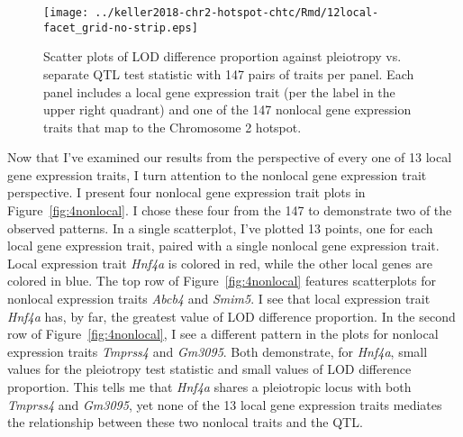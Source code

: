 \documentclass[oneside]{book}\usepackage[]{graphicx}\usepackage[]{color}
\begin{document}
\begin{titlepage}
\begin{figure}
    \centering
    \texttt{[image: ../keller2018-chr2-hotspot-chtc/Rmd/12local-facet\_grid-no-strip.eps]}
    \caption[LOD difference proportion vs. pleiotropy test statistic from the per-local gene perspective.]{Scatter plots of LOD difference proportion against pleiotropy vs. separate QTL
    test statistic with 147 pairs of traits per panel.
    Each panel includes a local gene expression trait
    (per the label in the upper right quadrant) and one of the 147 nonlocal gene
    expression traits that map to the Chromosome 2 hotspot.}
    \label{fig:nothnf4a-12}
\end{figure}








Now that I've examined our results from the perspective of every one of 13 local gene expression traits,
I turn attention to the nonlocal gene expression trait perspective.
I present four nonlocal gene expression trait plots in Figure~\ref{fig:4nonlocal}. I chose
these four from the 147 to demonstrate two of the observed patterns. In a single scatterplot,
I've plotted 13 points, one for each local gene expression trait, paired with a single
nonlocal gene expression trait. Local expression trait \emph{Hnf4a} is colored in red,
while the other local genes are colored in blue. The top row of Figure~\ref{fig:4nonlocal}
features scatterplots for nonlocal expression traits \emph{Abcb4} and \emph{Smim5}. I see
that local expression trait \emph{Hnf4a} has, by far, the greatest value of LOD difference
proportion. In the second row of Figure~\ref{fig:4nonlocal}, I see a different pattern in
the plots for nonlocal expression traits \emph{Tmprss4} and \emph{Gm3095}. Both demonstrate,
for \emph{Hnf4a}, small values for the pleiotropy test statistic and small values of LOD
difference proportion. This tells me that \emph{Hnf4a} shares a pleiotropic locus with both
\emph{Tmprss4} and \emph{Gm3095}, yet none of the 13 local gene expression traits mediates
the relationship between these two nonlocal traits and the QTL.



\end{titlepage}
\end{document}
